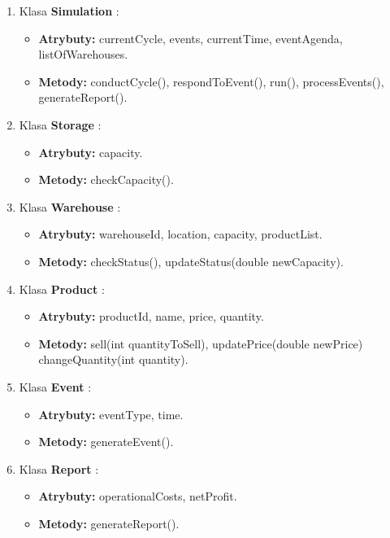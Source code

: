 \documentclass[11pt]{article}
\begin{document}
\begin{enumerate}

    \item Klasa \textbf{Simulation} :
    \begin{itemize}
        \item \textbf{Atrybuty:} currentCycle, events, currentTime, eventAgenda, listOfWarehouses.
        \item \textbf{Metody:} conductCycle(), respondToEvent(), run(), processEvents(), generateReport().
    \end{itemize}

    \item Klasa \textbf{Storage} :
    \begin{itemize}
        \item \textbf{Atrybuty:} capacity.
        \item \textbf{Metody:} checkCapacity().
    \end{itemize}

    \item Klasa \textbf{Warehouse} :
    \begin{itemize}
        \item \textbf{Atrybuty:} warehouseId, location, capacity, productList.
        \item \textbf{Metody:} checkStatus(), updateStatus(double newCapacity).
    \end{itemize}

    \item Klasa \textbf{Product} :
    \begin{itemize}
        \item \textbf{Atrybuty:} productId, name, price, quantity.
        \item \textbf{Metody:} sell(int quantityToSell), updatePrice(double newPrice)
        changeQuantity(int quantity).
    \end{itemize}

    \item Klasa \textbf{Event} :
    \begin{itemize}
        \item \textbf{Atrybuty:} eventType, time.
        \item \textbf{Metody:} generateEvent().
    \end{itemize}

    \item Klasa \textbf{Report} :
    \begin{itemize}
        \item \textbf{Atrybuty:} operationalCosts, netProfit.
        \item \textbf{Metody:} generateReport().
    \end{itemize}


\end{enumerate}
\end{document}
